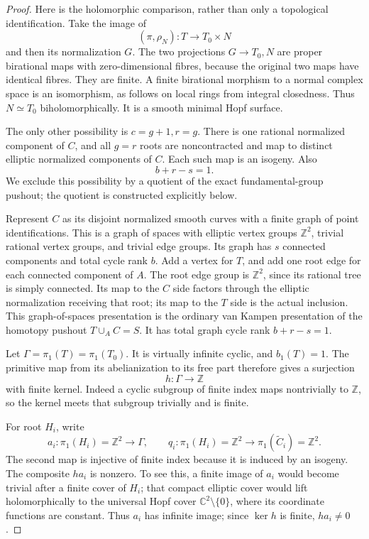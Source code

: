 \begin{proof}
Here is the holomorphic comparison, rather than only a topological
identification. Take the image of
\[
 (\pi,\rho_N):T\longrightarrow T_0\times N
\]
and then its normalization \(G\). The two projections \(G\to T_0,N\)
are proper birational maps with zero-dimensional fibres, because the
original two maps have identical fibres. They are finite. A finite
birational morphism to a normal complex space is an isomorphism, as follows
on local rings from integral closedness. Thus \(N\simeq T_0\)
biholomorphically. It is a smooth minimal Hopf surface.

The only other possibility is \(c=g+1,r=g\). There is one rational
normalized component of \(C\), and all \(g=r\) roots are noncontracted and
map to distinct elliptic normalized components of \(C\). Each such map is
an isogeny. Also
\[
 b+r-s=1.
\]
We exclude this possibility by a quotient of the exact fundamental-group
pushout; the quotient is constructed explicitly below.

Represent \(C\) as its disjoint normalized smooth curves with a finite
graph of point identifications. This is a graph of spaces with elliptic
vertex groups \(\mathbb Z^2\), trivial rational vertex groups, and trivial
edge groups. Its graph has \(s\) connected components and total cycle rank
\(b\). Add a vertex for \(T\), and add one root edge for each connected
component of \(A\). The root edge group is \(\mathbb Z^2\), since its
rational tree is simply connected. Its map to the \(C\) side factors
through the elliptic normalization receiving that root; its map to the
\(T\) side is the actual inclusion. This graph-of-spaces presentation is
the ordinary van Kampen presentation of the homotopy pushout
\(T\cup_A C=S\). It has total graph cycle rank \(b+r-s=1\).

Let \(\Gamma=\pi_1(T)=\pi_1(T_0)\). It is virtually infinite cyclic, and
\(b_1(T)=1\). The primitive map from its abelianization to its free part
therefore gives a surjection
\[
 h:\Gamma\longrightarrow\mathbb Z
\]
with finite kernel. Indeed a cyclic subgroup of finite index maps
nontrivially to \(\mathbb Z\), so the kernel meets that subgroup trivially
and is finite.

For root \(H_i\), write
\[
 a_i:\pi_1(H_i)=\mathbb Z^2\longrightarrow\Gamma,\qquad
 q_i:\pi_1(H_i)=\mathbb Z^2\longrightarrow
       \pi_1(\widetilde C_i)=\mathbb Z^2.
\]
The second map is injective of finite index because it is induced by an
isogeny. The composite \(h a_i\) is nonzero. To see this, a finite image
of \(a_i\) would become trivial after a finite cover of \(H_i\); that
compact elliptic cover would lift holomorphically to the universal Hopf
cover \(\mathbb C^2\setminus\{0\}\), where its coordinate functions are
constant. Thus \(a_i\) has infinite image; since \(\ker h\) is finite,
\(h a_i\ne0\).


\end{proof}
